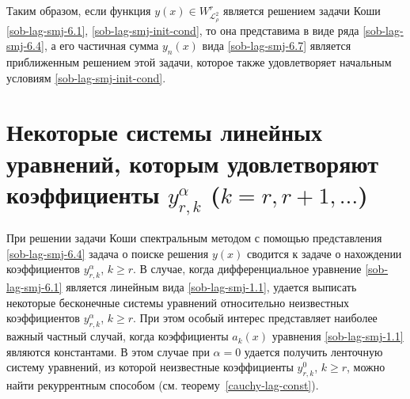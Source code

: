 Таким образом, если функция $y(x) \in W^{r}_{\mathcal{L}_{\rho}^2}$ является решением задачи Коши
\eqref{sob-lag-smj-6.1}, \eqref{sob-lag-smj-init-cond}, то она представима в виде ряда \eqref{sob-lag-smj-6.4}, а его частичная сумма $y_n(x)$ вида \eqref{sob-lag-smj-6.7} является приближенным решением этой задачи, которое также удовлетворяет начальным условиям \eqref{sob-lag-smj-init-cond}.

\section{Некоторые системы линейных уравнений, которым удовлетворяют коэффициенты $y_{r,k}^\alpha$ ($k=r,r+1,\ldots$)}
При решении задачи Коши спектральным методом с помощью представления \eqref{sob-lag-smj-6.4} задача о поиске решения $y(x)$ сводится к задаче о нахождении коэффициентов $y^\alpha_{r,k}$, $k \ge r$. В случае, когда дифференциальное уравнение \eqref{sob-lag-smj-6.1} является линейным вида \eqref{sob-lag-smj-1.1}, удается выписать некоторые бесконечные системы уравнений относительно неизвестных коэффициентов $y^\alpha_{r,k}$, $k \ge r$. При этом особый интерес представляет наиболее важный частный случай, когда коэффициенты $a_k(x)$ уравнения \eqref{sob-lag-smj-1.1} являются
константами. В этом случае при $\alpha=0$ удается получить ленточную систему уравнений, из которой неизвестные коэффициенты $y^0_{r,k}$, $k \ge r$, можно найти рекуррентным способом (см. теорему~\ref{cauchy-lag-const}).

